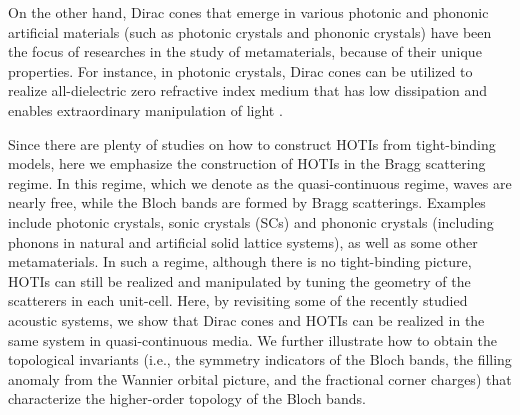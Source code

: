 \documentclass[doublecol]{epl2}
\begin{document}
On the other hand, Dirac cones \cite{neto2009electronic} that emerge in various photonic and phononic artificial materials (such as photonic crystals and phononic crystals) have been the focus of researches in the study of metamaterials, because of their unique properties.
For instance, in photonic crystals, Dirac cones can be utilized to realize all-dielectric zero refractive index medium that has low dissipation and enables extraordinary manipulation of light \cite{huang2011dirac,sakoda2012double,chan2012dirac,li2021dirac}. %

Since there are plenty of studies on how to construct HOTIs from tight-binding models, here we emphasize the construction of HOTIs in the Bragg scattering regime. In this regime, which we denote as the quasi-continuous regime, waves are nearly free, while the Bloch bands are formed by Bragg scatterings. Examples include photonic crystals, sonic crystals (SCs) and phononic crystals (including phonons in natural and artificial solid lattice systems), as well as some other metamaterials. In such a regime, although there is no tight-binding picture, HOTIs can still be realized and manipulated by tuning the geometry of the scatterers in each unit-cell. Here, by revisiting some of the recently studied acoustic systems, we show that Dirac cones and HOTIs can be realized in the same system in quasi-continuous media. We further illustrate how to obtain the topological invariants (i.e., the symmetry indicators of the Bloch bands, the filling anomaly from the Wannier orbital picture, and the fractional corner charges) that characterize the higher-order topology of the Bloch bands.


\end{document}
